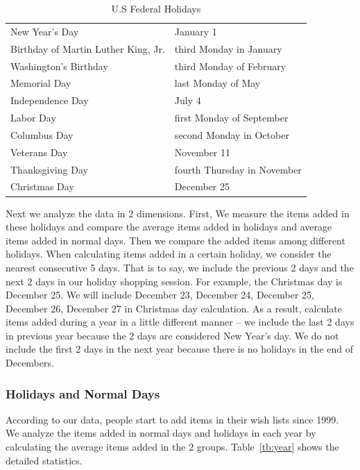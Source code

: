 \begin{table}[!ht]
\centering
\caption{U.S Federal Holidays}
\label{tb:holiday}
\begin{adjustbox}{max width=.5\textwidth}
\begin{tabular}{ll}
New Year's Day & January 1  \\
Birthday of Martin Luther King, Jr. & third Monday in January  \\
Washington's Birthday & third Monday of February  \\
Memorial Day & last Monday of May \\
Independence Day & July 4  \\
Labor Day & first Monday of September  \\
Columbus Day & second Monday in October  \\
Veterans Day & November 11  \\
Thanksgiving Day & fourth Thursday in November  \\
Christmas Day & December 25  \\
\end{tabular}
\end{adjustbox}
\end{table}

Next we analyze the data in 2 dimensions. First, We measure the items added in these holidays and compare the average items added in holidays and average items added in normal days. Then we compare the added items among different holidays. When calculating items added in a certain holiday, we consider the nearest consecutive 5 days. That is to say, we include the previous 2 days and the next 2 days in our holiday shopping session. For example, the Christmas day is December 25. We will include December 23, December 24, December 25, December 26, December 27 in Christmas day calculation. As a result, calculate items added during a year in a little different manner -- we include the last 2 days in previous year because the 2 days are considered New Year's day. We do not include the first 2 days in the next year because there is no holidays in the end of Decembers.


\subsubsection{Holidays and Normal Days}
According to our data, people start to add items in their wish lists since 1999. We analyze the items added in normal days and holidays in each year by calculating the average items added in the 2 groups. Table~\ref{tb:year} shows the detailed statistics.

